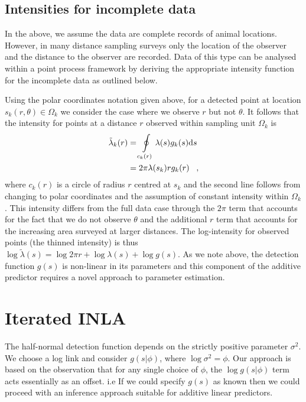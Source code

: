 \documentclass[preprint,12pt]{elsarticle}
\newcommand{\tl}{\tilde{\lambda}}   %
\begin{document}
\subsection{Intensities for incomplete data}

In the above, we assume the data are complete records of animal locations.  However, in many distance sampling surveys only the location of the observer and the distance to the observer are recorded.  Data of this type can be analysed within a point process framework by deriving the appropriate intensity function for the incomplete data as outlined below.

Using the polar coordinates notation given above, for a detected point at location $s_k(r, \theta) \in \Omega_k$ we consider the case where we observe $r$ but not $\theta$.  It follows that the intensity for points at a distance $r$ observed within sampling unit $\Omega_k$ is
\begin{align}
\label{intensity-incomplete}
\tl_k(r) &= \oint\displaylimits_{c_k(r)} \lambda(s)g_k(s)\mathrm{d}s \nonumber \\
&= 2\pi\lambda(s_k)rg_k(r) \;\;\; ,
\end{align}
 where $c_k(r)$ is a circle of radius $r$ centred at $s_k$ and the second line follows from changing to polar coordinates and the assumption of constant intensity within $\Omega_k$.  This intensity differs from the full data case through the $2\pi$  term that accounts for the fact that we do not observe $\theta$ and the additional $r$ term that accounts for the increasing area surveyed at larger distances.  The log-intensity for observed points (the thinned intensity) is thus $\log\tl(s) = \log 2 \pi r + \log\lambda(s) + \log g(s)$.  As we note above, the detection function $g(s)$ is non-linear in its parameters and this component of the additive predictor requires a novel approach to parameter estimation.

\section{Iterated INLA}

The half-normal detection function depends on the strictly positive parameter $\sigma^2$.  We choose a log link and consider $g(s | \phi)$, where $\log\sigma^2 = \phi$.   Our approach is based on the observation that for any single choice of $\phi$, the $\log g(s | \phi)$ term acts essentially as an offset. i.e If we could specify $g(s)$ as known then we could proceed with an inference approach suitable for additive linear predictors.
\end{document}
